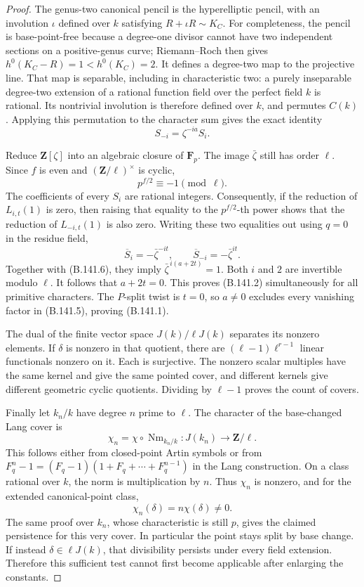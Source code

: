 \begin{proof}
The genus-two canonical pencil is the hyperelliptic pencil,
with an involution $\iota$ defined over $k$ satisfying
$R+\iota R\sim K_C$.
For completeness, the pencil is base-point-free because a
degree-one divisor cannot have two independent sections on a
positive-genus curve; Riemann--Roch then gives
$h^0(K_C-R)=1<h^0(K_C)=2$.
It defines a degree-two map to the projective line.
That map is separable, including in characteristic two:
a purely inseparable degree-two extension of a rational
function field over the perfect field $k$ is rational.
Its nontrivial involution is therefore defined over $k$,
and permutes $C(k)$.
Applying this permutation to the character sum gives the exact identity
\[
                       S_{-i}=\zeta^{-ia}S_i.                \tag{B.141.6}
\]

Reduce $\mathbf Z[\zeta]$ into an algebraic closure of
$\mathbf F_p$.
The image $\bar\zeta$ still has order $\ell$.
Since $f$ is even and $(\mathbf Z/\ell)^\times$ is cyclic,
\[
                             p^{f/2}\equiv-1\pmod\ell.
                                                            \tag{B.141.7}
\]
The coefficients of every $S_i$ are rational integers.
Consequently, if the reduction of $L_{i,t}(1)$ is zero,
then raising that equality to the $p^{f/2}$-th power shows
that the reduction of $L_{-i,t}(1)$ is also zero.
Writing these two equalities out using $q=0$ in the residue field,
\[
        \overline S_i=-\bar\zeta^{-it},
                     \qquad
        \overline S_{-i}=-\bar\zeta^{it}.
\]
Together with (B.141.6), they imply
$\bar\zeta^{\,i(a+2t)}=1$.
Both $i$ and $2$ are invertible modulo $\ell$.
It follows that $a+2t=0$.
This proves (B.141.2) simultaneously for all primitive characters.
The $P$-split twist is $t=0$, so $a\ne0$ excludes every vanishing
factor in (B.141.5), proving (B.141.1).

The dual of the finite vector space $J(k)/\ell J(k)$ separates
its nonzero elements.  If $\delta$ is nonzero in that quotient,
there are $(\ell-1)\ell^{r-1}$ linear functionals nonzero on it.
Each is surjective.  The nonzero scalar multiples have the same
kernel and give the same pointed cover, and different kernels give
different geometric cyclic quotients.
Dividing by $\ell-1$ proves the count of covers.

Finally let $k_n/k$ have degree $n$ prime to $\ell$.
The character of the base-changed Lang cover is
\[
       \chi_n=\chi\circ\operatorname{Nm}_{k_n/k}:J(k_n)
                              \longrightarrow\mathbf Z/\ell.
                                                            \tag{B.141.8}
\]
This follows either from closed-point Artin symbols or from
$F_q^n-1=(F_q-1)(1+F_q+\cdots+F_q^{n-1})$ in the Lang construction.
On a class rational over $k$, the norm is multiplication by $n$.
Thus $\chi_n$ is nonzero, and for the extended canonical-point class,
\[
                            \chi_n(\delta)=n\chi(\delta)\ne0.
\]
The same proof over $k_n$, whose characteristic is still $p$,
gives the claimed persistence for this very cover.
In particular the point stays split by base change.
If instead $\delta\in\ell J(k)$, that divisibility persists under
every field extension.  Therefore this sufficient test cannot
first become applicable after enlarging the constants.


\end{proof}
